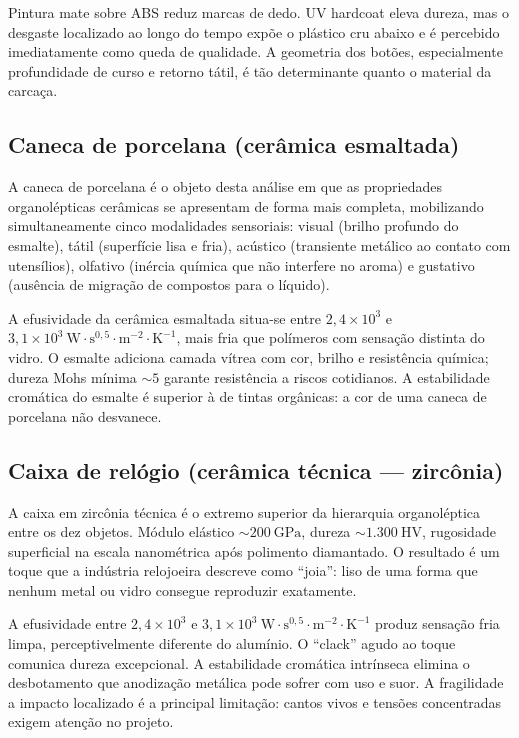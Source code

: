 \documentclass[
  12pt,
  a4paper,
  oneside,
  brazil,
  chapter=TITLE
]{article}
\begin{document}
Pintura mate sobre ABS reduz marcas de dedo. UV hardcoat eleva dureza, mas o desgaste
localizado ao longo do tempo expõe o plástico cru abaixo e é percebido imediatamente como
queda de qualidade. A geometria dos botões, especialmente profundidade de curso e retorno
tátil, é tão determinante quanto o material da carcaça.

\subsection{Caneca de porcelana (cerâmica esmaltada)}

A caneca de porcelana é o objeto desta análise em que as propriedades organolépticas
cerâmicas se apresentam de forma mais completa, mobilizando simultaneamente cinco
modalidades sensoriais: visual (brilho profundo do esmalte), tátil (superfície lisa e fria),
acústico (transiente metálico ao contato com utensílios), olfativo (inércia química que
não interfere no aroma) e gustativo (ausência de migração de compostos para o líquido).

A efusividade da cerâmica esmaltada situa-se entre $2{,}4 \times 10^{3}$ e
$3{,}1 \times 10^{3}\ \mathrm{W \cdot s^{0{,}5} \cdot m^{-2} \cdot K^{-1}}$, mais fria
que polímeros com sensação distinta do vidro. O esmalte adiciona camada vítrea com cor,
brilho e resistência química; dureza Mohs mínima ${\sim}5$ garante resistência a riscos
cotidianos. A estabilidade cromática do esmalte é superior à de tintas orgânicas: a cor
de uma caneca de porcelana não desvanece.

\subsection{Caixa de relógio (cerâmica técnica --- zircônia)}

A caixa em zircônia técnica é o extremo superior da hierarquia organoléptica entre os dez
objetos. Módulo elástico ${\sim}200\ \mathrm{GPa}$, dureza ${\sim}1.300\ \mathrm{HV}$,
rugosidade superficial na escala nanométrica após polimento diamantado. O resultado é um
toque que a indústria relojoeira descreve como ``joia'': liso de uma forma que nenhum
metal ou vidro consegue reproduzir exatamente.

A efusividade entre $2{,}4 \times 10^{3}$ e
$3{,}1 \times 10^{3}\ \mathrm{W \cdot s^{0{,}5} \cdot m^{-2} \cdot K^{-1}}$ produz
sensação fria limpa, perceptivelmente diferente do alumínio. O ``clack'' agudo ao toque
comunica dureza excepcional. A estabilidade cromática intrínseca elimina o desbotamento
que anodização metálica pode sofrer com uso e suor. A fragilidade a impacto localizado é
a principal limitação: cantos vivos e tensões concentradas exigem atenção no projeto.
\end{document}
